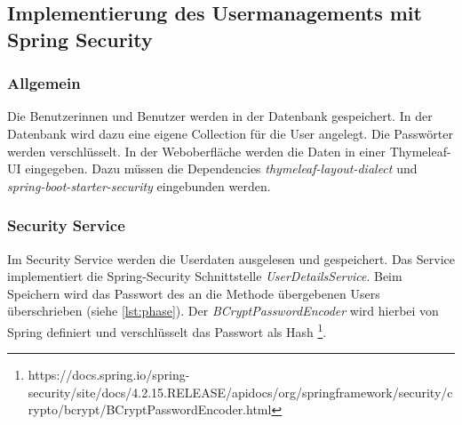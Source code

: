 \subsection{Implementierung des Usermanagements mit Spring Security}
\subsubsection{Allgemein}
Die Benutzerinnen und Benutzer werden in der Datenbank gespeichert. In der Datenbank wird dazu eine eigene Collection für die User angelegt. Die Passwörter werden verschlüsselt. In der Weboberfläche werden die Daten in einer Thymeleaf-UI eingegeben. Dazu müssen die Dependencies \textit{thymeleaf-layout-dialect} und \textit{spring-boot-starter-security} eingebunden werden. 
\subsubsection{Security Service}   
Im Security Service werden die Userdaten ausgelesen und gespeichert. Das Service implementiert die Spring-Security Schnittstelle \textit{UserDetailsService}. Beim Speichern wird das Passwort des an die Methode übergebenen Users überschrieben (siehe \ref{lst:phase}). Der \textit{BCryptPasswordEncoder} wird hierbei von Spring definiert und verschlüsselt das Passwort als Hash \footnote{https://docs.spring.io/spring-security/site/docs/4.2.15.RELEASE/apidocs/org/springframework/security/crypto/bcrypt/BCryptPasswordEncoder.html}. 

\lstset{
  caption={Speichern und Auslesen des Users. Beim Speichern des Benutzers wird das Passwort automatisch verschlüsselt.}, 
  basicstyle=\small\ttfamily, 
  label=lst:phase, 
  language=Java,
  frame=single,
  breaklines=true, %
  postbreak=\mbox{\textcolor{red}{$\hookrightarrow$}\space},
}

